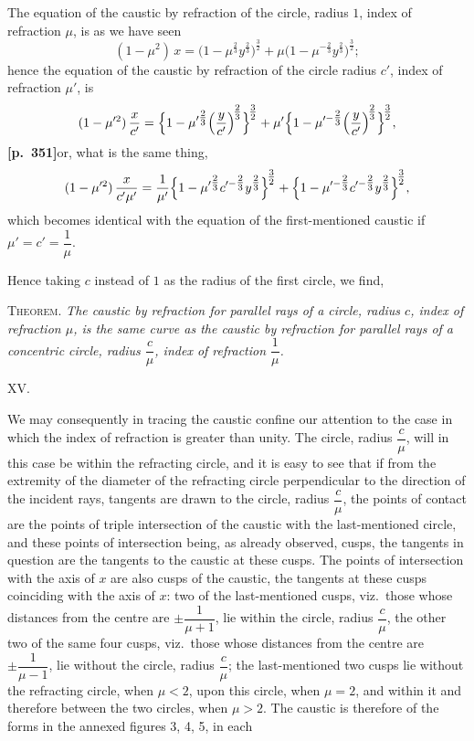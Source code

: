 \documentclass[11pt]{article}
\begin{document}
The equation of the caustic by refraction of the circle, radius $1$, index of refraction $\mu$, is as we have seen
\[
(1 - \mu^{2})\,x = \bigl(1 - \mu^{\tfrac{2}{3}}y^{\tfrac{2}{3}}\bigr)^{\tfrac{3}{2}} + \mu\bigl(1 - \mu^{-\tfrac{2}{3}}y^{\tfrac{2}{3}}\bigr)^{\tfrac{3}{2}};
\]
hence the equation of the caustic by refraction of the circle radius $c'$, index of refraction $\mu'$, is
\[
(1 - \mu'^{2})\,\frac{x}{c'} = \Bigl\{1 - \mu'^{\tfrac{2}{3}}\Bigl(\frac{y}{c'}\Bigr)^{\!\tfrac{2}{3}}\Bigr\}^{\!\tfrac{3}{2}} + \mu'\Bigl\{1 - \mu'^{-\tfrac{2}{3}}\Bigl(\frac{y}{c'}\Bigr)^{\!\tfrac{2}{3}}\Bigr\}^{\!\tfrac{3}{2}},
\]
\textbf{[p.~351]}\quad or, what is the same thing,
\[
(1 - \mu'^{2})\,\frac{x}{c'\mu'} = \frac{1}{\mu'}\Bigl\{1 - \mu'^{\tfrac{2}{3}}c'^{-\tfrac{2}{3}}y^{\tfrac{2}{3}}\Bigr\}^{\!\tfrac{3}{2}} + \Bigl\{1 - \mu'^{-\tfrac{2}{3}}c'^{-\tfrac{2}{3}}y^{\tfrac{2}{3}}\Bigr\}^{\!\tfrac{3}{2}},
\]
which becomes identical with the equation of the first-mentioned caustic if $\mu' = c' = \dfrac{1}{\mu}$.

Hence taking $c$ instead of $1$ as the radius of the first circle, we find,

\smallskip

\noindent\textsc{Theorem}. \textit{The caustic by refraction for parallel rays of a circle, radius $c$, index of refraction $\mu$, is the same curve as the caustic by refraction for parallel rays of a concentric circle, radius $\dfrac{c}{\mu}$, index of refraction $\dfrac{1}{\mu}$.}

\medskip
\begin{center}XV.\end{center}

We may consequently in tracing the caustic confine our attention to the case in which the index of refraction is greater than unity. The circle, radius $\dfrac{c}{\mu}$, will in this case be within the refracting circle, and it is easy to see that if from the extremity of the diameter of the refracting circle perpendicular to the direction of the incident rays, tangents are drawn to the circle, radius $\dfrac{c}{\mu}$, the points of contact are the points of triple intersection of the caustic with the last-mentioned circle, and these points of intersection being, as already observed, cusps, the tangents in question are the tangents to the caustic at these cusps. The points of intersection with the axis of $x$ are also cusps of the caustic, the tangents at these cusps coinciding with the axis of $x$: two of the last-mentioned cusps, viz.\ those whose distances from the centre are $\pm\dfrac{1}{\mu + 1}$, lie within the circle, radius $\dfrac{c}{\mu}$, the other two of the same four cusps, viz.\ those whose distances from the centre are $\pm\dfrac{1}{\mu - 1}$, lie without the circle, radius $\dfrac{c}{\mu}$; the last-mentioned two cusps lie without the refracting circle, when $\mu < 2$, upon this circle, when $\mu = 2$, and within it and therefore between the two circles, when $\mu > 2$. The caustic is therefore of the forms in the annexed figures 3, 4, 5, in each
\end{document}
